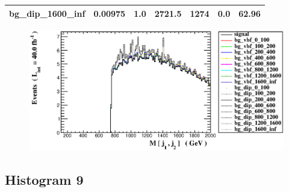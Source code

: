 \documentclass[a4paper, 10pt]{article}
\begin{document}
\begin{table}[H]
\begin{center}
\begin{tabular}{|m{23.0mm}|m{23.0mm}|m{18.0mm}|m{19.0mm}|m{19.0mm}|m{19.0mm}|m{19.0mm}|}
      \hline
      {\cellcolor{white}         bg\_dip\_1600\_inf}& {\cellcolor{white}         0.00975}& {\cellcolor{white}         1.0}& {\cellcolor{white}         2721.5}& {\cellcolor{white}         1274}& {\cellcolor{red}         0.0}& {\cellcolor{red}         62.96}\\
\hline
    \end{tabular}
  \end{center}
\end{table}

\begin{figure}[H]
  \begin{center}
    \includegraphics[scale=0.45]{selection_7.eps}\\
\caption{   }
  \end{center}
\end{figure}
      \newpage
\subsection{ Histogram 9}
\end{document}
